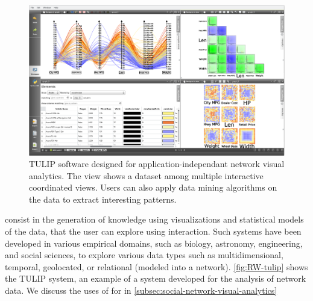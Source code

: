 \begin{figure}
    \centering %
    \includegraphics[width=1\textwidth]{static/figures/RelatedWork/TULIP}
    \caption{TULIP software designed for application-independant network visual analytics\cite{auberTULIP2017}. The view shows a dataset among multiple interactive coordinated views. Users can also apply data mining algorithms on the data to extract interesting patterns.}
    \label{fig:RW-tulip}
\end{figure}

\va consist in the generation of knowledge using visualizations and statistical models of the data, that the user can explore using interaction.
Such systems have been developed in various empirical domains, such as biology, astronomy, engineering, and social sciences, to explore various data types such as multidimensional, temporal, geolocated, or relational (\ie modeled into a network).
\autoref{fig:RW-tulip} shows the TULIP system, an example of a \va system developed for the analysis of network data.
We discuss the uses of \va for \hsna in \autoref{subsec:social-network-visual-analytics}



